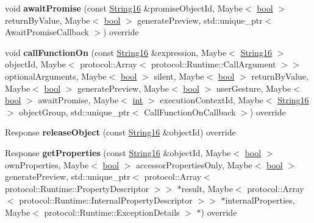 \begin{DoxyCompactItemize}
\item 
\mbox{\label{classv8__inspector_1_1V8RuntimeAgentImpl_a24c0aeabcb347163fb4fe8b10d3914bd}} 
void {\bfseries await\+Promise} (const \mbox{\hyperlink{classv8__inspector_1_1String16}{String16}} \&promise\+Object\+Id, Maybe$<$ \mbox{\hyperlink{classbool}{bool}} $>$ return\+By\+Value, Maybe$<$ \mbox{\hyperlink{classbool}{bool}} $>$ generate\+Preview, std\+::unique\+\_\+ptr$<$ Await\+Promise\+Callback $>$) override
\item 
\mbox{\label{classv8__inspector_1_1V8RuntimeAgentImpl_a2301446071f715114b052cc8d65b7a3b}} 
void {\bfseries call\+Function\+On} (const \mbox{\hyperlink{classv8__inspector_1_1String16}{String16}} \&expression, Maybe$<$ \mbox{\hyperlink{classv8__inspector_1_1String16}{String16}} $>$ object\+Id, Maybe$<$ protocol\+::\+Array$<$ protocol\+::\+Runtime\+::\+Call\+Argument $>$$>$ optional\+Arguments, Maybe$<$ \mbox{\hyperlink{classbool}{bool}} $>$ silent, Maybe$<$ \mbox{\hyperlink{classbool}{bool}} $>$ return\+By\+Value, Maybe$<$ \mbox{\hyperlink{classbool}{bool}} $>$ generate\+Preview, Maybe$<$ \mbox{\hyperlink{classbool}{bool}} $>$ user\+Gesture, Maybe$<$ \mbox{\hyperlink{classbool}{bool}} $>$ await\+Promise, Maybe$<$ \mbox{\hyperlink{classint}{int}} $>$ execution\+Context\+Id, Maybe$<$ \mbox{\hyperlink{classv8__inspector_1_1String16}{String16}} $>$ object\+Group, std\+::unique\+\_\+ptr$<$ Call\+Function\+On\+Callback $>$) override
\item 
\mbox{\label{classv8__inspector_1_1V8RuntimeAgentImpl_af3fcaf65d01af618fb50c9deb5258495}} 
Response {\bfseries release\+Object} (const \mbox{\hyperlink{classv8__inspector_1_1String16}{String16}} \&object\+Id) override
\item 
\mbox{\label{classv8__inspector_1_1V8RuntimeAgentImpl_a1263c6b9e70926a218cf2521cd8f0446}} 
Response {\bfseries get\+Properties} (const \mbox{\hyperlink{classv8__inspector_1_1String16}{String16}} \&object\+Id, Maybe$<$ \mbox{\hyperlink{classbool}{bool}} $>$ own\+Properties, Maybe$<$ \mbox{\hyperlink{classbool}{bool}} $>$ accessor\+Properties\+Only, Maybe$<$ \mbox{\hyperlink{classbool}{bool}} $>$ generate\+Preview, std\+::unique\+\_\+ptr$<$ protocol\+::\+Array$<$ protocol\+::\+Runtime\+::\+Property\+Descriptor $>$$>$ $\ast$result, Maybe$<$ protocol\+::\+Array$<$ protocol\+::\+Runtime\+::\+Internal\+Property\+Descriptor $>$$>$ $\ast$internal\+Properties, Maybe$<$ protocol\+::\+Runtime\+::\+Exception\+Details $>$ $\ast$) override
$$
\end{DoxyCompactItemize}
